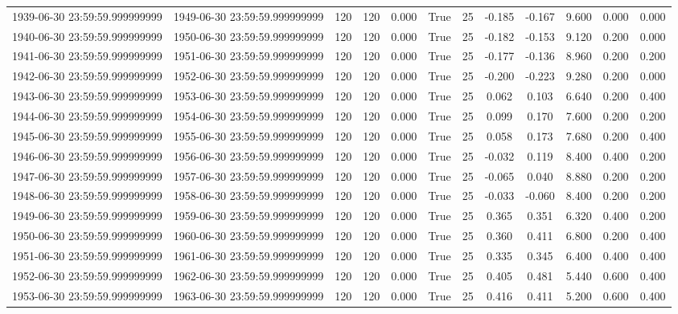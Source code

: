 \begin{table}
\begin{tabular}{lccccccccccc}
1939-06-30 23:59:59.999999999 & 1949-06-30 23:59:59.999999999 & 120 & 120 & 0.000 & True & 25 & -0.185 & -0.167 & 9.600 & 0.000 & 0.000 \\
1940-06-30 23:59:59.999999999 & 1950-06-30 23:59:59.999999999 & 120 & 120 & 0.000 & True & 25 & -0.182 & -0.153 & 9.120 & 0.200 & 0.000 \\
1941-06-30 23:59:59.999999999 & 1951-06-30 23:59:59.999999999 & 120 & 120 & 0.000 & True & 25 & -0.177 & -0.136 & 8.960 & 0.200 & 0.200 \\
1942-06-30 23:59:59.999999999 & 1952-06-30 23:59:59.999999999 & 120 & 120 & 0.000 & True & 25 & -0.200 & -0.223 & 9.280 & 0.200 & 0.000 \\
1943-06-30 23:59:59.999999999 & 1953-06-30 23:59:59.999999999 & 120 & 120 & 0.000 & True & 25 & 0.062 & 0.103 & 6.640 & 0.200 & 0.400 \\
1944-06-30 23:59:59.999999999 & 1954-06-30 23:59:59.999999999 & 120 & 120 & 0.000 & True & 25 & 0.099 & 0.170 & 7.600 & 0.200 & 0.200 \\
1945-06-30 23:59:59.999999999 & 1955-06-30 23:59:59.999999999 & 120 & 120 & 0.000 & True & 25 & 0.058 & 0.173 & 7.680 & 0.200 & 0.400 \\
1946-06-30 23:59:59.999999999 & 1956-06-30 23:59:59.999999999 & 120 & 120 & 0.000 & True & 25 & -0.032 & 0.119 & 8.400 & 0.400 & 0.200 \\
1947-06-30 23:59:59.999999999 & 1957-06-30 23:59:59.999999999 & 120 & 120 & 0.000 & True & 25 & -0.065 & 0.040 & 8.880 & 0.200 & 0.200 \\
1948-06-30 23:59:59.999999999 & 1958-06-30 23:59:59.999999999 & 120 & 120 & 0.000 & True & 25 & -0.033 & -0.060 & 8.400 & 0.200 & 0.200 \\
1949-06-30 23:59:59.999999999 & 1959-06-30 23:59:59.999999999 & 120 & 120 & 0.000 & True & 25 & 0.365 & 0.351 & 6.320 & 0.400 & 0.200 \\
1950-06-30 23:59:59.999999999 & 1960-06-30 23:59:59.999999999 & 120 & 120 & 0.000 & True & 25 & 0.360 & 0.411 & 6.800 & 0.200 & 0.400 \\
1951-06-30 23:59:59.999999999 & 1961-06-30 23:59:59.999999999 & 120 & 120 & 0.000 & True & 25 & 0.335 & 0.345 & 6.400 & 0.400 & 0.400 \\
1952-06-30 23:59:59.999999999 & 1962-06-30 23:59:59.999999999 & 120 & 120 & 0.000 & True & 25 & 0.405 & 0.481 & 5.440 & 0.600 & 0.400 \\
1953-06-30 23:59:59.999999999 & 1963-06-30 23:59:59.999999999 & 120 & 120 & 0.000 & True & 25 & 0.416 & 0.411 & 5.200 & 0.600 & 0.400 \\

\end{tabular}
\end{table}
